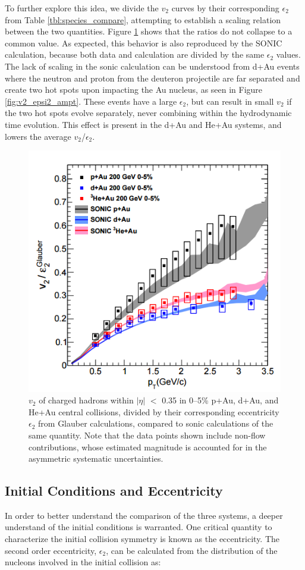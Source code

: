 To further explore this idea, we divide the $v_2$ curves by their corresponding $\epsilon_2$ from Table \ref{tbl:species_compare}, attempting to establish
 a scaling relation between the two quantities. Figure \ref{fig:v2_divided_epsilon_all_sys} shows that the ratios do not collapse to a common value. As
 expected, this behavior is also reproduced by the SONIC calculation, because both data and calculation are divided
 by the same $\epsilon_2$ values. The lack of scaling in the sonic calculation can be understood from d+Au events where
 the neutron and proton from the deuteron projectile are far separated and create two hot spots upon impacting the 
Au nucleus, as seen in Figure \ref{fig:v2_epsi2_ampt}. These events have a large $\epsilon_2$, but can result in small $v_2$ if the two hot spots evolve separately, never
combining within the hydrodynamic time evolution. This effect is present in the d+Au and He+Au systems, and lowers the average $v_2$/$\epsilon_2$. 
\begin{figure}[!ht]
\begin{center}
\includegraphics[width=0.65\linewidth]{figs/v2_divided_epsilon_all_sys.PNG}
\caption{$v_2$ of charged hadrons within $|\eta|$ $<$ 0.35 in 0–5\% p+Au,  d+Au, and He+Au central collisions, divided by their corresponding eccentricity $\epsilon_2$ from Glauber calculations, compared to sonic calculations of the same quantity. Note that the data points shown include non-flow contributions, whose estimated
magnitude is accounted for in the asymmetric systematic uncertainties.}
\label{fig:v2_divided_epsilon_all_sys}
\end{center}
\end{figure}

\subsection{Initial Conditions and Eccentricity}
In order to better understand the comparison of the three systems, a deeper understand of the initial conditions is warranted. One critical quantity to characterize the initial collision symmetry is known as the eccentricity. The second order eccentricity, $\epsilon_2$, can be calculated from the distribution of the nucleons involved in the initial collision as:

